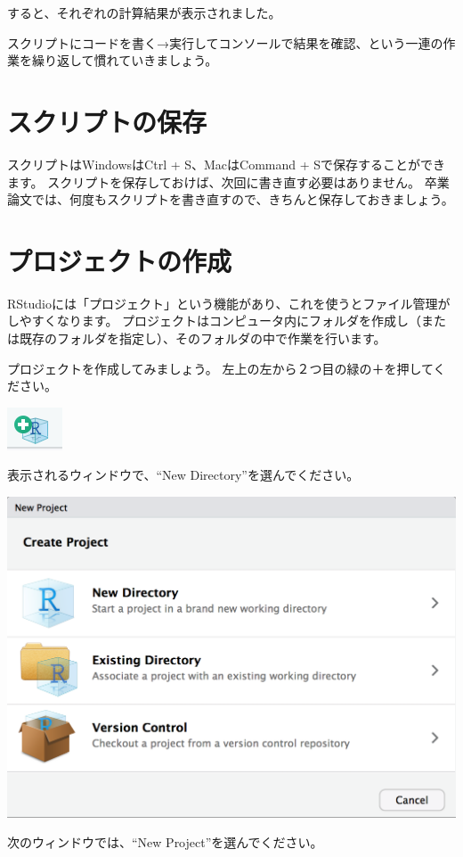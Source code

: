 \documentclass[]{book}
\begin{document}
すると、それぞれの計算結果が表示されました。

スクリプトにコードを書く→実行してコンソールで結果を確認、という一連の作業を繰り返して慣れていきましょう。

\section{スクリプトの保存}\label{ux30b9ux30afux30eaux30d7ux30c8ux306eux4fddux5b58}

スクリプトはWindowsはCtrl + S、MacはCommand +
Sで保存することができます。
スクリプトを保存しておけば、次回に書き直す必要はありません。
卒業論文では、何度もスクリプトを書き直すので、きちんと保存しておきましょう。

\section{プロジェクトの作成}\label{ux30d7ux30edux30b8ux30a7ux30afux30c8ux306eux4f5cux6210}

RStudioには「プロジェクト」という機能があり、これを使うとファイル管理がしやすくなります。
プロジェクトはコンピュータ内にフォルダを作成し（または既存のフォルダを指定し）、そのフォルダの中で作業を行います。

プロジェクトを作成してみましょう。
左上の左から２つ目の緑の＋を押してください。

\begin{center}\includegraphics[width=0.05\linewidth]{image/project1} \end{center}

表示されるウィンドウで、``New Directory''を選んでください。

\begin{center}\includegraphics[width=0.5\linewidth]{image/project2} \end{center}

次のウィンドウでは、``New Project''を選んでください。
\end{document}
